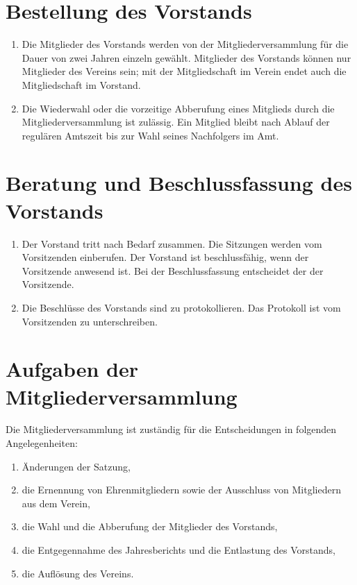\section{Bestellung des Vorstands}
\begin{enumerate}[label=(\arabic*)]
    \item Die Mitglieder des Vorstands werden von der Mitgliederversammlung für
        die Dauer von zwei Jahren einzeln gewählt. Mitglieder des Vorstands
        können nur Mitglieder des Vereins sein; mit der Mitgliedschaft im
        Verein endet auch die Mitgliedschaft im Vorstand.
    \item Die Wiederwahl oder die vorzeitige Abberufung eines Mitglieds durch
        die Mitgliederversammlung ist zulässig. Ein Mitglied bleibt nach Ablauf
        der regulären Amtszeit bis zur Wahl seines Nachfolgers im Amt.
\end{enumerate}

\section{Beratung und Beschlussfassung des Vorstands}
\begin{enumerate}[label=(\arabic*)]
    \item Der Vorstand tritt nach Bedarf zusammen. Die Sitzungen werden vom
        Vorsitzenden einberufen. Der Vorstand ist beschlussfähig, wenn der
        Vorsitzende anwesend ist. Bei der Beschlussfassung entscheidet der
        der Vorsitzende.
    \item Die Beschlüsse des Vorstands sind zu protokollieren. Das Protokoll
        ist vom Vorsitzenden zu unterschreiben.
\end{enumerate}

\section{Aufgaben der Mitgliederversammlung}
Die Mitgliederversammlung ist zuständig für die Entscheidungen in folgenden
Angelegenheiten:
\begin{enumerate}[label=\alph*)]
    \item Änderungen der Satzung,
    \item die Ernennung von Ehrenmitgliedern sowie der Ausschluss von
        Mitgliedern aus dem Verein,
    \item die Wahl und die Abberufung der Mitglieder des Vorstands,
    \item die Entgegennahme des Jahresberichts und die Entlastung des Vorstands,
    \item die Auflösung des Vereins.
\end{enumerate}

